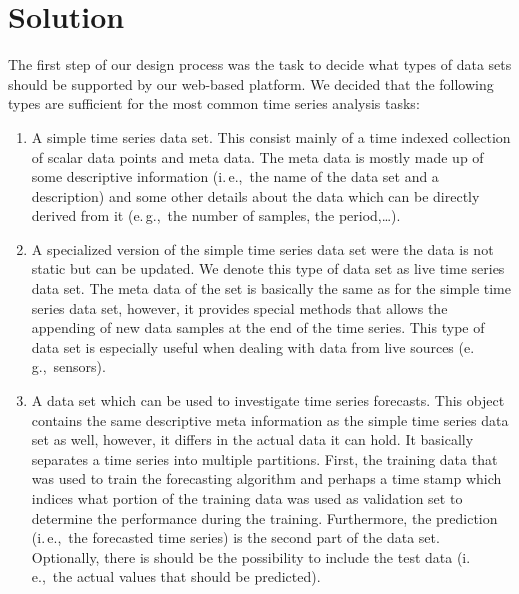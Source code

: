 \documentclass[runningheads,a4paper,11pt]{llncs}
\newcommand{\eg}{e.\,g.,\ }
\newcommand{\ie}{i.\,e.,\ }
\begin{document}
\section{Solution}\label{sec:solution}

The first step of our design process was the task to decide what types of data sets should be supported by our web-based platform.
We decided that the following types are sufficient for the most common time series analysis tasks:

\begin{enumerate}
 \item A simple time series data set. This consist mainly of a time indexed collection of scalar data points and meta data.
 The meta data is mostly made up of some descriptive information (\ie the name of the data set and a description) and some other details about the data which can be directly derived from it (\eg the number of samples, the period,\ldots).

 \item A specialized version of the simple time series data set were the data is not static but can be updated.
 We denote this type of data set as live time series data set.
 The meta data of the set is basically the same as for the simple time series data set, however, it provides special methods that allows the appending of new data samples at the end of the time series.
 This type of data set is especially useful when dealing with data from live sources (\eg sensors). 
 
 \item A data set which can be used to investigate time series forecasts.
 This object contains the same descriptive meta information as the simple time series data set as well, however, it differs in the actual data it can hold.
 It basically separates a time series into multiple partitions. 
 First, the training data that was used to train the forecasting algorithm and perhaps a time stamp which indices what portion of the training data was used as validation set to determine the performance during the training.
 Furthermore, the prediction (\ie the forecasted time series) is the second part of the data set.
 Optionally, there is should be the possibility to include the test data (\ie the actual values that should be predicted).
\end{enumerate}
\end{document}
